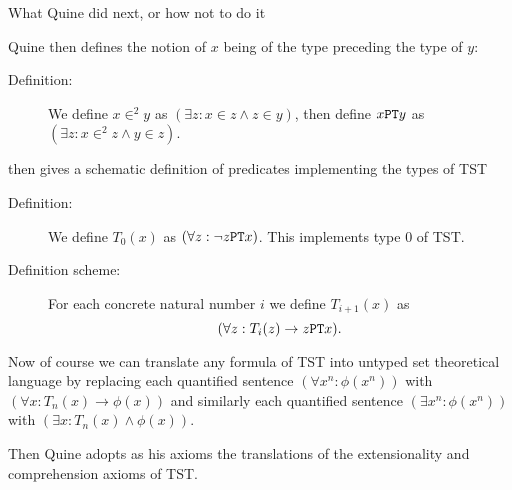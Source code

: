 \documentclass{slides}
\begin{document}
\begin{slide}

{\Large What Quine did next, or how not to do it}

Quine then defines the notion of $x$ being of the type preceding the type of $y$:

\begin{description}

\item[Definition:]  We define $x \in^2 y$ as \newline $(\exists z:x \in z \wedge z \in y)$, then define $x {\tt PT} y$ as $(\exists z:x \in^2 z \wedge y \in z)$.  

\end{description}

then gives a schematic definition of predicates implementing the types of TST

\begin{description}

\item[Definition:]  We define $T_0(x)$ as $(\forall z:\neg z{\tt PT}x)$.  This implements type 0 of TST.

\item[Definition scheme:]  For each concrete natural number $i$ we define $T_{i+1}(x)$ as $$(\forall z:T_i(z) \rightarrow z {\tt PT} x).$$

\end{description}

\end{slide}

\begin{slide}


Now of course we can translate any formula of TST into untyped set theoretical language by replacing each quantified sentence \newline $(\forall x^n:\phi(x^n))$ with
$(\forall x:T_n(x) \rightarrow \phi(x))$ and similarly each quantified sentence $(\exists x^n:\phi(x^n))$ with
$(\exists x:T_n(x) \wedge \phi(x))$.

Then Quine adopts as his axioms the translations of the extensionality and comprehension axioms of TST.


\end{slide}
\end{document}
